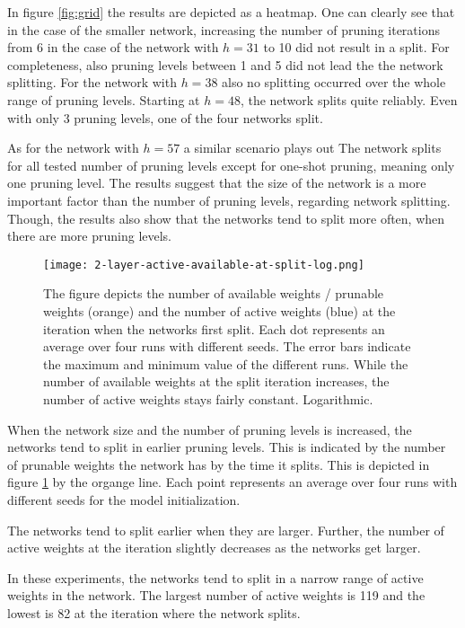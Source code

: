 In figure \ref{fig:grid} the results are depicted as a heatmap. 
One can clearly see that in the case of the smaller network, increasing the number of pruning iterations from 6 in the case of the network with $h=31$ to 10 did not result in a split.
For completeness, also pruning levels between 1 and 5 did not lead the the network splitting.
For the network with $h=38$ also no splitting occurred over the whole range of pruning levels.
Starting at $h=48$, the network splits quite reliably.
Even with only $3$ pruning levels, one of the four networks split.

As for the network with $h=57$ a similar scenario plays out
The network splits for all tested number of pruning levels except for one-shot pruning, meaning only one pruning level.
The results suggest that the size of the network is a more important factor than the number of pruning levels, regarding network splitting.
Though, the results also show that the networks tend to split more often, when there are more pruning levels.

\begin{figure}[ht]
    \centering
    \texttt{[image: 2-layer-active-available-at-split-log.png]}
    \caption{
        The figure depicts the number of available weights / prunable weights (orange) and the number of active weights (blue) at the iteration when the networks first split.
        Each dot represents an average over four runs with different seeds.
        The error bars indicate the maximum and minimum value of the different runs.
        While the number of available weights at the split iteration increases, the number of active weights stays fairly constant.
        Logarithmic.
    }
    \label{fig:active-split}
\end{figure}

When the network size and the number of pruning levels is increased, the networks tend to split in earlier pruning levels.
This is indicated by the number of prunable weights the network has by the time it splits.
This is depicted in figure \ref{fig:active-split} by the organge line. 
Each point represents an average over four runs with different seeds for the model initialization. 

The networks tend to split earlier when they are larger.
Further, the number of active weights at the iteration slightly decreases as the networks get larger.

In these experiments, the networks tend to split in a narrow range of active weights in the network.
The largest number of active weights is 119 and the lowest is 82 at the iteration where the network splits.

